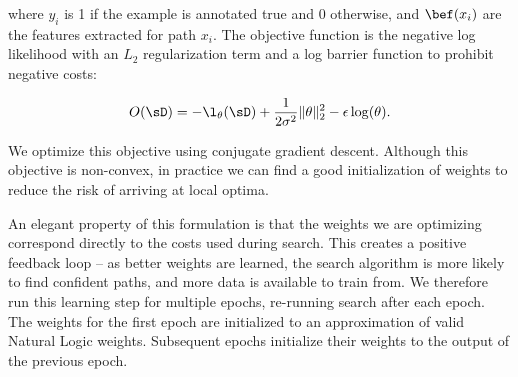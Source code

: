 \noindent where $y_i$ is 1 if the example is annotated true and 0
  otherwise, and $\bef(x_i)$ are the features extracted for path $x_i$.
The objective function is the negative log likelihood with
  an $L_2$ regularization term and a log barrier function to 
  prohibit negative costs:

\vspace{-1.0em}
\begin{equation*}
O(\sD) = -\l_\theta(\sD) 
  + \frac{1}{2 \sigma^2}\|\theta\|_2^2
  - \epsilon \log(\theta).
\end{equation*}
\vspace{-1.0em}

We optimize this objective using conjugate gradient descent.
Although this objective is non-convex, in practice we can find a good
  initialization of weights to reduce the risk of arriving at
  local optima.

An elegant property of this formulation is that the weights we are
  optimizing correspond directly to the costs used during search.
This creates a positive feedback loop -- as better weights are learned,
  the search algorithm is more likely to find confident paths, and
  more data is available to train from.
We therefore run this learning step for multiple epochs,
  re-running search after each epoch.
The weights for the first epoch are initialized to an approximation
  of valid Natural Logic weights.
Subsequent epochs initialize their weights to the output of the previous
  epoch.






